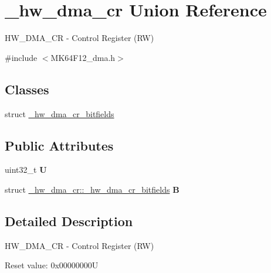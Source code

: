 \hypertarget{union__hw__dma__cr}{}\section{\+\_\+hw\+\_\+dma\+\_\+cr Union Reference}
\label{union__hw__dma__cr}


H\+W\+\_\+\+D\+M\+A\+\_\+\+CR -\/ Control Register (RW)  




{\ttfamily \#include $<$M\+K64\+F12\+\_\+dma.\+h$>$}

\subsection*{Classes}
\begin{DoxyCompactItemize}
\item 
struct \hyperlink{struct__hw__dma__cr_1_1__hw__dma__cr__bitfields}{\+\_\+hw\+\_\+dma\+\_\+cr\+\_\+bitfields}
\end{DoxyCompactItemize}
\subsection*{Public Attributes}
\begin{DoxyCompactItemize}
\item 
uint32\+\_\+t {\bfseries U}\hypertarget{union__hw__dma__cr_aaa46d2ec372f59547f994781b2768cd6}{}\label{union__hw__dma__cr_aaa46d2ec372f59547f994781b2768cd6}

\item 
struct \hyperlink{struct__hw__dma__cr_1_1__hw__dma__cr__bitfields}{\+\_\+hw\+\_\+dma\+\_\+cr\+::\+\_\+hw\+\_\+dma\+\_\+cr\+\_\+bitfields} {\bfseries B}\hypertarget{union__hw__dma__cr_ade75f98107d9848b5a9377332eda6d3b}{}\label{union__hw__dma__cr_ade75f98107d9848b5a9377332eda6d3b}

\end{DoxyCompactItemize}


\subsection{Detailed Description}
H\+W\+\_\+\+D\+M\+A\+\_\+\+CR -\/ Control Register (RW) 

Reset value\+: 0x00000000U

